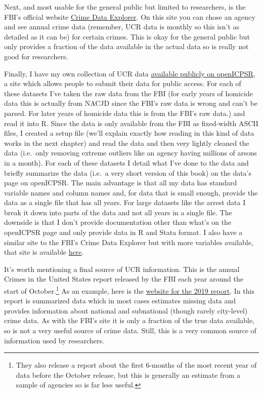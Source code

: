 \documentclass[
  12pt,
  openany]{book}
\begin{document}
Next, and most usable for the general public but limited to researchers, is the FBI's official website \href{https://crime-data-explorer.fr.cloud.gov/}{Crime Data Explorer}. On this site you can chose an agency and see annual crime data (remember, UCR data is monthly so this isn't as detailed as it can be) for certain crimes. This is okay for the general public but only provides a fraction of the data available in the actual data so is really not good for researchers.

Finally, I have my own collection of UCR data \href{https://www.openicpsr.org/openicpsr/search/studies?start=0\&ARCHIVE=openicpsr\&sort=score\%20desc\%2CDATEUPDATED\%20desc\&rows=25\&q=jacob\%20kaplan\%27s\%20concatenated\%20files}{available publicly on openICPSR}, a site which allows people to submit their data for public access. For each of these datasets I've taken the raw data from the FBI (for early years of homicide data this is actually from NACJD since the FBI's raw data is wrong and can't be parsed. For later years of homicide data this is from the FBI's raw data.) and read it into R. Since the data is only available from the FBI as fixed-width ASCII files, I created a setup file (we'll explain exactly how reading in this kind of data works in the next chapter) and read the data and then very lightly cleaned the data (i.e.~only removing extreme outliers like an agency having millions of arsons in a month). For each of these datasets I detail what I've done to the data and briefly summarize the data (i.e.~a very short version of this book) on the data's page on openICPSR. The main advantage is that all my data has standard variable names and column names and, for data that is small enough, provide the data as a single file that has all years. For large datasets like the arrest data I break it down into parts of the data and not all years in a single file. The downside is that I don't provide documentation other than what's on the openICPSR page and only provide data in R and Stata format. I also have a similar site to the FBI's Crime Data Explorer but with more variables available, that site is available \href{jacobdkaplan.com/}{here}.

It's worth mentioning a final source of UCR information. This is the annual Crimes in the United States report released by the FBI each year around the start of October.\footnote{They also release a report about the first 6-months of the most recent year of data before the October release, but this is generally an estimate from a sample of agencies so is far less useful.} As an example, here is the \href{https://ucr.fbi.gov/crime-in-the-u.s/2019/crime-in-the-u.s.-2019}{website for the 2019 report}. In this report is summarized data which in most cases estimates missing data and provides information about national and subnational (though rarely city-level) crime data. As with the FBI's site it is only a fraction of the true data available, so is not a very useful source of crime data. Still, this is a very common source of information used by researchers.
\end{document}
